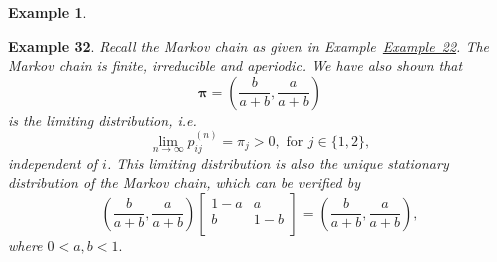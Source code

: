 \documentclass[
]{book}
\theoremstyle{definition}
\theoremstyle{definition}
\newtheorem{example}{Example}[chapter]
\theoremstyle{definition}
\theoremstyle{definition}
\theoremstyle{remark}
\begin{document}
\begin{example}
\protect\hypertarget{exm:unlabeled-div-34}{}\label{exm:unlabeled-div-34}

\textbf{Example 32}. \emph{Recall the Markov chain as given in
Example~\protect\hyperlink{exampleStationary}{Example~22}. The Markov chain is finite, irreducible
and aperiodic. We have also shown that
\[\boldsymbol{\pi} = \left( \frac{b}{a+b},  \frac{a}{a+b} \right)\] is
the limiting distribution, i.e.
\[\lim_{n \rightarrow \infty} p_{ij}^{(n)} = \pi_j > 0 , \text{ for }j \in \{1,2\},\]
independent of \(i\). This limiting distribution is also the unique
stationary distribution of the Markov chain, which can be verified by
\[\left( \frac{b}{a+b},  \frac{a}{a+b} \right) \begin{bmatrix}
    1-a & a   \\
    b & 1-b   \\
\end{bmatrix} =  \left( \frac{b}{a+b},  \frac{a}{a+b} \right),\] where
\(0 < a,b < 1.\)}

\end{example}
\end{document}
